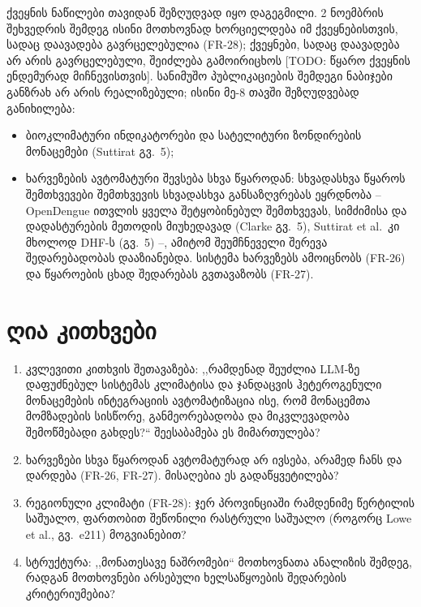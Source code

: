 \documentclass[11pt,a4paper]{article}
\newcommand{\enquote}[1]{,,#1``}
\newcommand{\todo}[1]{\textcolor{red!70!black}{[TODO: #1]}}
\begin{document}
ქვეყნის ნაწილები თავიდან შეზღუდვად იყო დაგეგმილი. 2 ნოემბრის შეხვედრის შემდეგ
ისინი მოთხოვნად ხორციელდება იმ ქვეყნებისთვის, სადაც დაავადება გავრცელებულია
(FR-28); ქვეყნები, სადაც დაავადება არ არის გავრცელებული, შეიძლება გამოირიცხოს
\todo{წყარო ქვეყნის ენდემურად მიჩნევისთვის}. სანიმუშო პუბლიკაციების შემდეგი
ნაბიჯები განზრახ არ არის რეალიზებული; ისინი მე-8 თავში შეზღუდვებად განიხილება:
\begin{itemize}[nosep]
  \item ბიოკლიმატური ინდიკატორები და სატელიტური ზონდირების მონაცემები (Suttirat გვ.~5);
  \item ხარვეზების ავტომატური შევსება სხვა წყაროდან: სხვადასხვა წყაროს შემთხვევები
        შემთხვევის სხვადასხვა განსაზღვრებას ეყრდნობა -- OpenDengue ითვლის ყველა
        შეტყობინებულ შემთხვევას, სიმძიმისა და დადასტურების მეთოდის მიუხედავად
        (Clarke გვ.~5), Suttirat et al.\ კი მხოლოდ DHF-ს (გვ.~5) --, ამიტომ
        შეუმჩნეველი შერევა შედარებადობას დააზიანებდა. სისტემა ხარვეზებს ამოიცნობს
        (FR-26) და წყაროების ცხად შედარებას გვთავაზობს (FR-27).
\end{itemize}

\section*{ღია კითხვები}\label{sec:questions_ka}
\begin{enumerate}[nosep]
  \item კვლევითი კითხვის შეთავაზება: \enquote{რამდენად შეუძლია LLM-ზე დაფუძნებულ
        სისტემას კლიმატისა და ჯანდაცვის ჰეტეროგენული მონაცემების ინტეგრაციის
        ავტომატიზაცია ისე, რომ მონაცემთა მომზადების სისწორე, განმეორებადობა და
        მიკვლევადობა შემოწმებადი გახდეს?} შეესაბამება ეს მიმართულება?
  \item ხარვეზები სხვა წყაროდან ავტომატურად არ ივსება, არამედ ჩანს და დარდება
        (FR-26, FR-27). მისაღებია ეს გადაწყვეტილება?
  \item რეგიონული კლიმატი (FR-28): ჯერ პროვინციაში რამდენიმე წერტილის საშუალო,
        ფართობით შეწონილი რასტრული საშუალო (როგორც Lowe et al., გვ.~e211) მოგვიანებით?
  \item სტრუქტურა: \enquote{მონათესავე ნაშრომები} მოთხოვნათა ანალიზის შემდეგ,
        რადგან მოთხოვნები არსებული ხელსაწყოების შედარების კრიტერიუმებია?
\end{enumerate}
\end{document}
